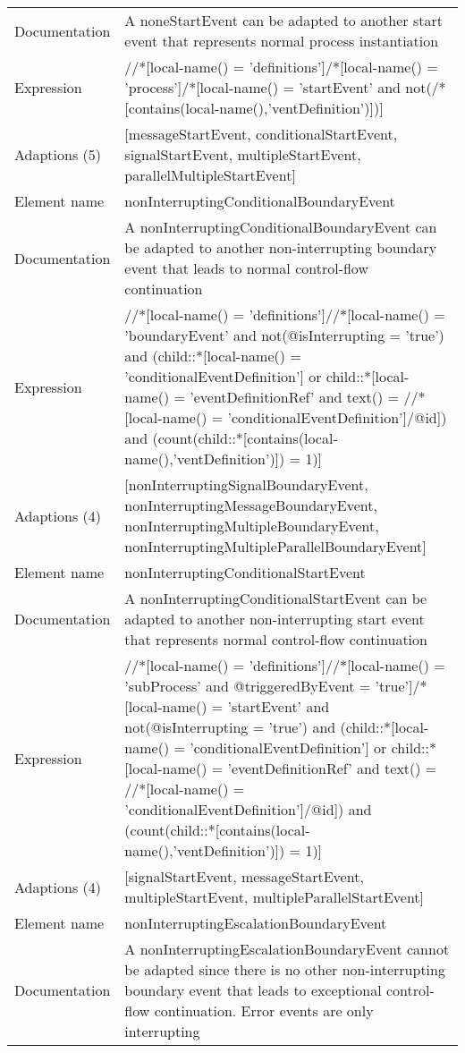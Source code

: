 \begin{center}
\begin{tiny}
\begin{longtable}{p{}|p{}}
\myrowcolour
Documentation &A noneStartEvent can be adapted to another start event that represents normal process instantiation\\
Expression & //*[local-name() = 'definitions']/*[local-name() = 'process']/*[local-name() = 'startEvent' and not(/*[contains(local-name(),'ventDefinition')])]\\
\myrowcolour
Adaptions (5) & [messageStartEvent, conditionalStartEvent, signalStartEvent, multipleStartEvent, parallelMultipleStartEvent]\\
\midrule
Element name & nonInterruptingConditionalBoundaryEvent\\
\myrowcolour
Documentation &A nonInterruptingConditionalBoundaryEvent can be adapted to another non-interrupting boundary event that leads to normal control-flow continuation\\
Expression & //*[local-name() = 'definitions']//*[local-name() = 'boundaryEvent' and not(@isInterrupting = 'true') and (child::*[local-name() = 'conditionalEventDefinition'] or child::*[local-name() = 'eventDefinitionRef' and text() = //*[local-name() = 'conditionalEventDefinition']/@id]) and (count(child::*[contains(local-name(),'ventDefinition')]) = 1)]\\
\myrowcolour
Adaptions (4) & [nonInterruptingSignalBoundaryEvent, nonInterruptingMessageBoundaryEvent, nonInterruptingMultipleBoundaryEvent, nonInterruptingMultipleParallelBoundaryEvent]\\
\midrule
Element name & nonInterruptingConditionalStartEvent\\
\myrowcolour
Documentation &A nonInterruptingConditionalStartEvent can be adapted to another non-interrupting start event that represents normal control-flow continuation\\
Expression & //*[local-name() = 'definitions']//*[local-name() = 'subProcess' and @triggeredByEvent = 'true']/*[local-name() = 'startEvent' and not(@isInterrupting = 'true') and (child::*[local-name() = 'conditionalEventDefinition'] or child::*[local-name() = 'eventDefinitionRef' and text() = //*[local-name() = 'conditionalEventDefinition']/@id]) and (count(child::*[contains(local-name(),'ventDefinition')]) = 1)]\\
\myrowcolour
Adaptions (4) & [signalStartEvent, messageStartEvent, multipleStartEvent, multipleParallelStartEvent]\\
\midrule
Element name & nonInterruptingEscalationBoundaryEvent\\
\myrowcolour
Documentation &A nonInterruptingEscalationBoundaryEvent cannot be adapted since there is no other non-interrupting boundary event that leads to exceptional control-flow continuation. Error events are only interrupting\\

\end{longtable}
\end{tiny}
\end{center}
